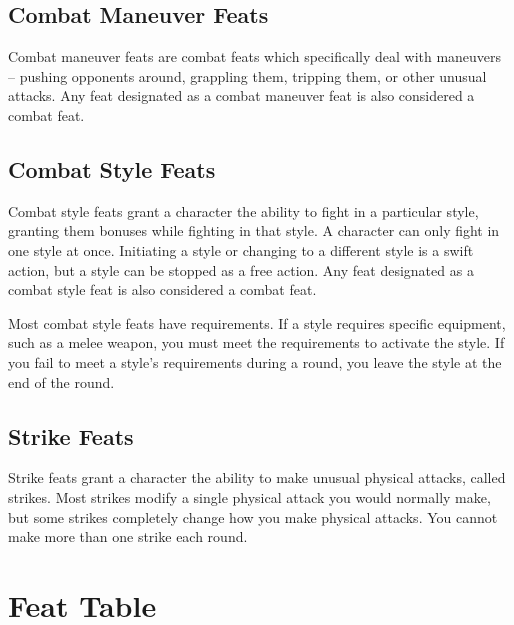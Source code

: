 \subsection{Combat Maneuver Feats}
Combat maneuver feats are combat feats which specifically deal with maneuvers -- pushing opponents around, grappling them, tripping them, or other unusual attacks.
Any feat designated as a combat maneuver feat is also considered a combat feat.

\subsection{Combat Style Feats}
Combat style feats grant a character the ability to fight in a particular style, granting them bonuses while fighting in that style.
A character can only fight in one style at once.
Initiating a style or changing to a different style is a swift action, but a style can be stopped as a free action.
Any feat designated as a combat style feat is also considered a combat feat.

Most combat style feats have requirements.
If a style requires specific equipment, such as a melee weapon, you must meet the requirements to activate the style.
If you fail to meet a style's requirements during a round, you leave the style at the end of the round.

\subsection{Strike Feats}\label{Strike Feats}
Strike feats grant a character the ability to make unusual physical attacks, called strikes.
Most strikes modify a single physical attack you would normally make, but some strikes completely change how you make physical attacks.
You cannot make more than one strike each round.

\section{Feat Table}
\onecolumn

